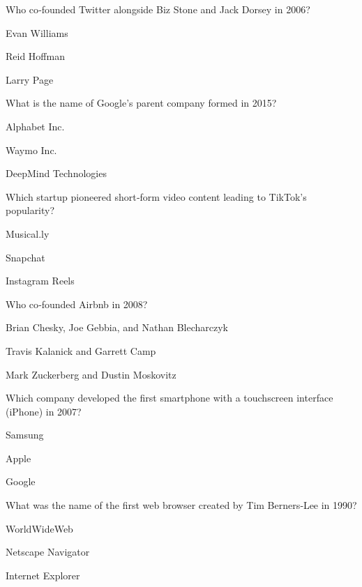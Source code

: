 \begin{enhancedmcq}{Who co‑founded Twitter alongside Biz Stone and Jack Dorsey in 2006?}
\item Evan Williams
\item Reid Hoffman
\item Larry Page

\end{enhancedmcq}
\begin{enhancedmcq}{What is the name of Google's parent company formed in 2015?}
\item Alphabet Inc.
\item Waymo Inc.
\item DeepMind Technologies

\end{enhancedmcq}
\begin{enhancedmcq}{Which startup pioneered short‑form video content leading to TikTok's popularity?}
\item Musical.ly
\item Snapchat
\item Instagram Reels

\end{enhancedmcq}
\begin{enhancedmcq}{Who co‑founded Airbnb in 2008?}
\item Brian Chesky, Joe Gebbia, and Nathan Blecharczyk
\item Travis Kalanick and Garrett Camp
\item Mark Zuckerberg and Dustin Moskovitz

\end{enhancedmcq}
\begin{enhancedmcq}{Which company developed the first smartphone with a touchscreen interface (iPhone) in 2007?}
\item Samsung
\item Apple
\item Google

\end{enhancedmcq}
\begin{enhancedmcq}{What was the name of the first web browser created by Tim Berners‑Lee in 1990?}
\item WorldWideWeb
\item Netscape Navigator
\item Internet Explorer

\end{enhancedmcq}
